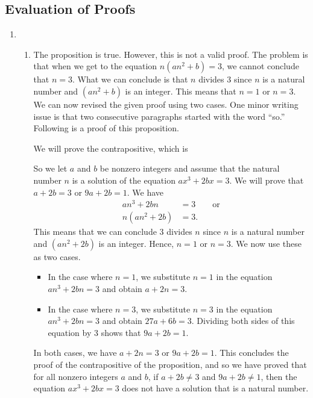 \subsection*{Evaluation of Proofs}
\setcounter{oldenumi}{\theenumi}
\begin{enumerate} \setcounter{enumi}{\theoldenumi}
\item \begin{enumerate}
\item The proposition is true.  However, this is not a valid proof.  The problem is that when we get to the equation $n\left( an^2 + b \right) = 3$, we cannot conclude that $n = 3$.  What we can conclude is that $n$ divides 3 since $n$ is a natural number and $ \left( an^2 + b\right)$ is an integer.  This means that $n = 1$ or $n = 3$.  We can now revised the given proof using two cases.
One minor writing issue is that two consecutive paragraphs started with the word ``so.''  Following is a proof of this proposition.


\begin{myproof}
We will prove the contrapositive, which is
\vskip6pt
\noindent
So we let $a$ and $b$ be nonzero integers and assume that the natural number $n$ is a solution of the equation $ax^3 + 2bx = 3$.  We will prove that $a + 2b = 3$ or $9a + 2b = 1$.  We have
\begin{align*}
an^3 + 2bn &= 3 \qquad \text{or}\\
n \left( an^2 + 2b \right) &= 3.
\end{align*}
This means that we can conclude 3 divides $n$ since $n$ is a natural number and 
$ \left( an^2 + 2b\right)$ is an integer.  Hence, $n = 1$ or $n = 3$.  We now use these as two cases.
\begin{itemize}
\item In the case where $n = 1$, we substitute $n = 1$ in the equation $an^3 + 2bn = 3$ and obtain 
$a + 2n = 3$.

\item In the case where $n = 3$, we substitute $n = 3$ in the equation $an^3 + 2bn = 3$ and obtain $27a + 6b = 3$.  Dividing both sides of this equation by 3 shows that $9a + 2b = 1$.  
\end{itemize}
In both cases, we have $a + 2n = 3$ or $9a + 2b = 1$.  This concludes the proof of the contrapositive of the proposition, and so we have proved that for all nonzero integers $a$ and $b$, if $a + 2b \ne 3$ and 
$9a + 2b \ne 1$, then the equation $ax^3 + 2bx = 3$ does not have a solution that is a natural number.
\end{myproof}



\end{enumerate}
\end{enumerate}
